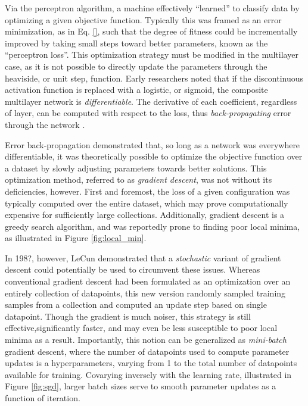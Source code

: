 Via the perceptron algorithm, a machine effectively ``learned'' to classify data by optimizing a given objective function.
Typically this was framed as an error minimization, as in Eq. \ref{}, such that the degree of fitness could be incrementally improved by taking small steps toward better parameters, known as the ``perceptron loss''.
This optimization strategy must be modified in the multilayer case, as it is not possible to directly update the parameters through the heaviside, or unit step, function.
Early researchers noted that if the discontinuous activation function is replaced with a logistic, or sigmoid, the composite multilayer network is \emph{differentiable}.
The derivative of each coefficient, regardless of layer, can be computed with respect to the loss, thus \emph{back-propagating} error through the network \cite{Hinton1986}.

Error back-propagation demonstrated that, so long as a network was everywhere differentiable, it was theoretically possible to optimize the objective function over a dataset by slowly adjusting parameters towards better solutions.
This optimization method, referred to as \emph{gradient descent}, was not without its deficiencies, however.
First and foremost, the loss of a given configuration was typically computed over the entire dataset, which may prove computationally expensive for sufficiently large collections.
Additionally, gradient descent is a greedy search algorithm, and was reportedly prone to finding poor local minima, as illustrated in Figure \ref{fig:local_min}.

In 198?, however, LeCun demonstrated that a \emph{stochastic} variant of gradient descent could potentially be used to circumvent these issues.
Whereas conventional gradient descent had been formulated as an optimization over an entirely collection of datapoints, this new version randomly sampled training samples from a collection and computed an update step based on single datapoint.
Though the gradient is much noiser, this strategy is still effective,significantly faster, and may even be less susceptible to poor local minima as a result.
Importantly, this notion can be generalized as \emph{mini-batch} gradient descent, where the number of datapoints used to compute parameter updates is a hyperparameters, varying from 1 to the total number of datapoints available for training.
Covarying inversely with the learning rate, illustrated in Figure \ref{fig:sgd}, larger batch sizes serve to smooth parameter updates as a function of iteration.

